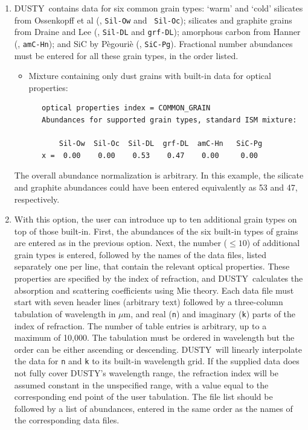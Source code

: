 \documentclass[11pt]{article}
\def\D  {{\sf DUSTY}}
\def\mic    {\hbox{$\mu$m}}
\begin{document}
\begin{enumerate}

\item \D\ contains data for six common grain types: `warm' and `cold'
    silicates from Ossenkopff et al (\cite{Oss92}, {\tt Sil-Ow} and {\tt
    Sil-Oc}); silicates and graphite grains from Draine and Lee
    (\cite{DL84}, {\tt Sil-DL} and {\tt grf-DL}); amorphous carbon from
    Hanner (\cite{Hann88}, {\tt amC-Hn}); and SiC by P\`egouri\`e
    (\cite{Peg88}, {\tt SiC-Pg}).  Fractional number abundances must be
    entered for all these grain types, in the order listed.

\begin{itemize}
\item Mixture containing only dust grains with built-in data for
    optical properties:

\begin{verbatim}
   optical properties index = COMMON_GRAIN
   Abundances for supported grain types, standard ISM mixture:

       Sil-Ow  Sil-Oc  Sil-DL  grf-DL  amC-Hn   SiC-Pg
   x =  0.00    0.00    0.53    0.47    0.00     0.00
\end{verbatim}
\end{itemize}
The overall abundance normalization is arbitrary.  In this example, the
silicate and graphite abundances could have been entered equivalently as 53
and 47, respectively.

\item With this option, the user can introduce up to ten additional grain
    types on top of those built-in.  First, the abundances of the six
    built-in types of grains are entered as in the previous option. Next,
    the number ($\le 10$) of additional grain types is entered, followed by
    the names of the data files, listed separately one per line, that
    contain the relevant optical properties. These properties are specified
    by the index of refraction, and \D\ calculates the absorption and
    scattering coefficients using Mie theory.  Each data file must start
    with seven header lines (arbitrary text) followed by a three-column
    tabulation of wavelength in \mic, and real ({\tt n}) and imaginary
    ({\tt k}) parts of the index of refraction. The number of table entries
    is arbitrary, up to a maximum of 10,000. The tabulation must be ordered
    in wavelength but the order can be either ascending or descending. \D\
    will linearly interpolate the data for {\tt n} and {\tt k} to its
    built-in wavelength grid. If the supplied data does not fully cover
    \D's wavelength range, the refraction index will be assumed constant in
    the unspecified range, with a value equal to the corresponding end
    point of the user tabulation. The file list should be followed by a
    list of abundances, entered in the same order as the names of the
    corresponding data files.


\end{enumerate}
\end{document}
